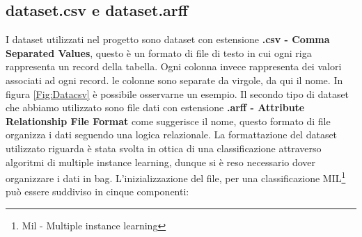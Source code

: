 \subsection{dataset.csv e dataset.arff}
I dataset utilizzati nel progetto sono dataset con estensione \textbf{.csv - Comma Separated Values}, questo è un formato di file di testo in cui ogni riga rappresenta un record della tabella. Ogni colonna invece rappresenta dei valori associati ad ogni record. le colonne sono separate da virgole, da qui il nome. In figura \ref{Fig:Datacsv} è possibile osservarne un esempio. 
\vspace{1em}
\newline
Il secondo tipo di dataset che abbiamo utilizzato sono file dati con estensione \textbf{.arff - Attribute Relationship File Format} come suggerisce il nome, questo formato di file organizza i dati seguendo una logica relazionale.
La formattazione del dataset utilizzato riguarda è stata svolta in ottica di una classificazione attraverso algoritmi di multiple instance learning, dunque si è reso necessario dover organizzare i dati in bag. L'inizializzazione del file, per una classificazione MIL\footnote{Mil - Multiple instance learning} può essere suddiviso in cinque componenti\cite{wekaDoc}:  
